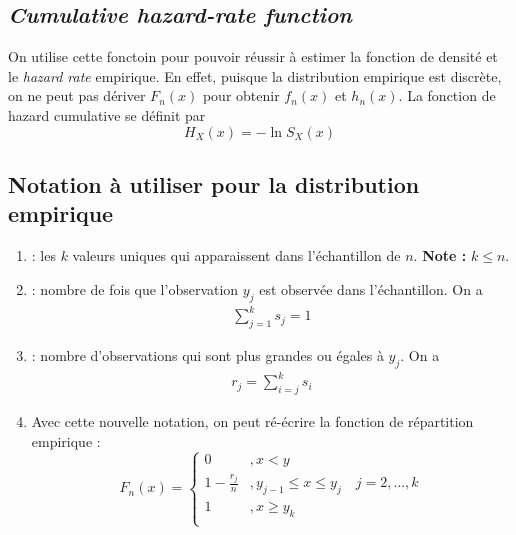 \documentclass[12pt, french]{report}
\begin{document}
\subsection{\textit{Cumulative hazard-rate function}}
On utilise cette fonctoin pour pouvoir réussir à estimer la fonction de densité et le \textit{hazard rate} empirique. En effet, puisque la distribution empirique est discrète, on ne peut pas dériver $F_n(x)$ pour obtenir $f_n(x)$ et $h_n(x)$. La fonction de hazard cumulative se définit par
\begin{equation}
H_X(x) = - \ln S_X(x)
\end{equation}

\subsection{Notation à utiliser pour la distribution empirique}
\begin{enumerate}[label=\faAngleRight]
\item {} : les $k$ valeurs uniques qui apparaissent dans l'échantillon de $n$. \textbf{Note : } $k \leq n$.

\item {} : nombre de fois que l'observation $y_j$ est observée dans l'échantillon. On a
\begin{align*}
\sum_{j=1}^{k} s_j = 1
\end{align*}

\item {} : nombre d'observations qui sont plus grandes ou égales à $y_j$. On a
\begin{align*}
r_j = \sum_{i=j}^{k} s_i
\end{align*}

\item Avec cette nouvelle notation, on peut ré-écrire la fonction de répartition empirique : 
\begin{equation}
F_n(x) = 
\begin{cases}
0						& , x < y \\
1 - \frac{r_j}{n}		& , y_{j-1} \leq x \leq y_j \quad j = 2, ..., k \\
1						& , x \geq y_k \\
\end{cases}
\end{equation}
\end{enumerate}
\end{document}
